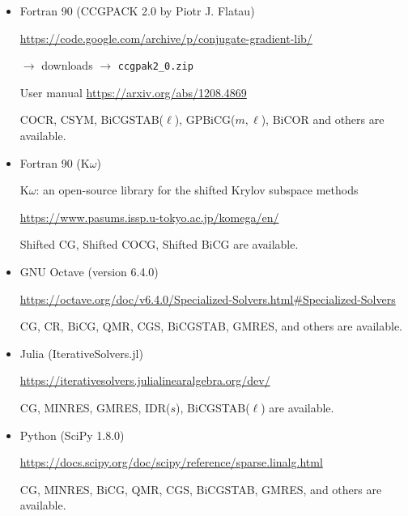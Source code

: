 \begin{itemize}
\item Fortran 90 ({CCGPACK 2.0 by Piotr J. Flatau})\par
\url{https://code.google.com/archive/p/conjugate-gradient-lib/}\par
$\to$ downloads $\to$ \texttt{ccgpak2\_0.zip}\par
{User manual} \url{https://arxiv.org/abs/1208.4869}\par
{COCR, CSYM, BiCGSTAB($\ell$), GPBiCG($m,\ell$), BiCOR and others are available.}

\item Fortran 90 (K$\omega$)\par
{K$\omega$: an open-source library for the shifted Krylov subspace methods}\par
\url{https://www.pasums.issp.u-tokyo.ac.jp/komega/en/}\par
{Shifted CG, Shifted COCG, Shifted BiCG are available.}

\item GNU Octave ({version 6.4.0})\par
\url{https://octave.org/doc/v6.4.0/Specialized-Solvers.html#Specialized-Solvers}\par
{CG, CR, BiCG, QMR, CGS, BiCGSTAB, GMRES, and others are available.}

\item Julia (IterativeSolvers.jl)\par
\url{https://iterativesolvers.julialinearalgebra.org/dev/}\par
{CG, MINRES, GMRES, IDR($s$), BiCGSTAB($\ell$) are available.}

\item Python (SciPy 1.8.0)\par
\url{https://docs.scipy.org/doc/scipy/reference/sparse.linalg.html}\par
{CG, MINRES, BiCG, QMR, CGS, BiCGSTAB, GMRES, and others are available.}
\end{itemize}
